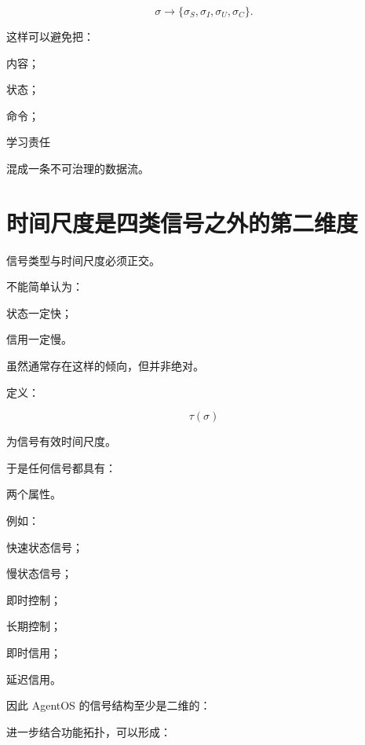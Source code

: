 \[
\sigma
\rightarrow
\{
\sigma_S,
\sigma_I,
\sigma_U,
\sigma_C
\}.
\]

这样可以避免把：

内容；

状态；

命令；

学习责任

混成一条不可治理的数据流。

\section{时间尺度是四类信号之外的第二维度}

信号类型与时间尺度必须正交。

不能简单认为：

状态一定快；

信用一定慢。

虽然通常存在这样的倾向，但并非绝对。

定义：

\[
\tau(\sigma)
\]

为信号有效时间尺度。

于是任何信号都具有：

\begin{statementbox}
\centering
{}
\end{statementbox}

两个属性。

例如：

快速状态信号；

慢状态信号；

即时控制；

长期控制；

即时信用；

延迟信用。

因此 AgentOS 的信号结构至少是二维的：

\begin{statementbox}
\centering
{}
\end{statementbox}

进一步结合功能拓扑，可以形成：

\begin{statementbox}
\centering
{}
\end{statementbox}

